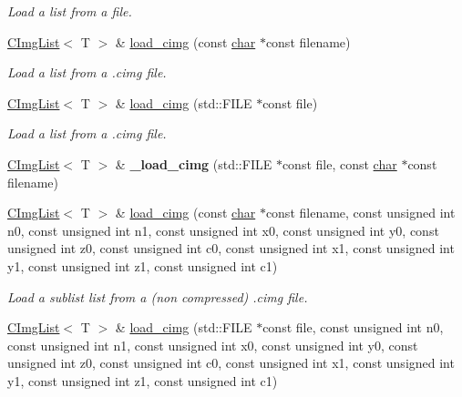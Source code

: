 \begin{DoxyCompactItemize}
\begin{DoxyCompactList}\small\item\em Load a list from a file. \end{DoxyCompactList}\item 
\hyperlink{structcimg__library__suffixed_1_1CImgList}{C\+Img\+List}$<$ T $>$ \& \hyperlink{structcimg__library__suffixed_1_1CImgList_a71365977297b4b063ca86026467657a4}{load\+\_\+cimg} (const \hyperlink{classchar}{char} $\ast$const filename)
\begin{DoxyCompactList}\small\item\em Load a list from a .cimg file. \end{DoxyCompactList}\item 
\hyperlink{structcimg__library__suffixed_1_1CImgList}{C\+Img\+List}$<$ T $>$ \& \hyperlink{structcimg__library__suffixed_1_1CImgList_a7f156e0813762a200a9997e014859793}{load\+\_\+cimg} (std\+::\+F\+I\+LE $\ast$const file)
\begin{DoxyCompactList}\small\item\em Load a list from a .cimg file. \end{DoxyCompactList}\item 
\mbox{\label{structcimg__library__suffixed_1_1CImgList_af1b7ce1621365a454d74bf0ab83253f3}} 
\hyperlink{structcimg__library__suffixed_1_1CImgList}{C\+Img\+List}$<$ T $>$ \& {\bfseries \+\_\+load\+\_\+cimg} (std\+::\+F\+I\+LE $\ast$const file, const \hyperlink{classchar}{char} $\ast$const filename)
\item 
\hyperlink{structcimg__library__suffixed_1_1CImgList}{C\+Img\+List}$<$ T $>$ \& \hyperlink{structcimg__library__suffixed_1_1CImgList_a7c4bbbf202665c691ed8693a2dacbac8}{load\+\_\+cimg} (const \hyperlink{classchar}{char} $\ast$const filename, const unsigned int n0, const unsigned int n1, const unsigned int x0, const unsigned int y0, const unsigned int z0, const unsigned int c0, const unsigned int x1, const unsigned int y1, const unsigned int z1, const unsigned int c1)
\begin{DoxyCompactList}\small\item\em Load a sublist list from a (non compressed) .cimg file. \end{DoxyCompactList}\item 
\mbox{\label{structcimg__library__suffixed_1_1CImgList_a95d601b8bf09f366908008ef27e876b3}} 
\hyperlink{structcimg__library__suffixed_1_1CImgList}{C\+Img\+List}$<$ T $>$ \& \hyperlink{structcimg__library__suffixed_1_1CImgList_a95d601b8bf09f366908008ef27e876b3}{load\+\_\+cimg} (std\+::\+F\+I\+LE $\ast$const file, const unsigned int n0, const unsigned int n1, const unsigned int x0, const unsigned int y0, const unsigned int z0, const unsigned int c0, const unsigned int x1, const unsigned int y1, const unsigned int z1, const unsigned int c1)

\end{DoxyCompactItemize}
